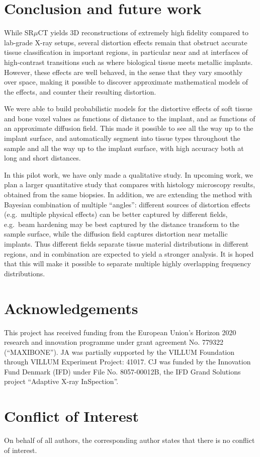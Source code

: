 \section{Conclusion and future work}
\label{sec:conclusion}

While SR$\mu$CT yields 3D reconstructions of extremely high fidelity compared to lab-grade X-ray setups,
several distortion effects remain that obstruct accurate tissue classification in important regions, in particular
near and at interfaces of high-contrast transitions such as where biological tissue meets metallic implants.
However, these effects are well behaved, in the sense that they vary smoothly over space, making it possible
to discover approximate mathematical models of the effects, and counter their resulting distortion.

We were able to build probabilistic models for the distortive effects
of soft tissue and bone voxel values as functions of distance to the
implant, and as functions of an approximate diffusion field. This made
it possible to see all the way up to the implant surface, and
automatically segment into tissue types throughout the sample and all
the way up to the implant surface, with high accuracy both at long and
short distances.

In this pilot work, we have only made a qualitative study. In upcoming
work, we plan a larger quantitative study that compares with histology
microscopy results, obtained from the same biopsies.  In addition, we
are extending the method with Bayesian combination of multiple
``angles'': different sources of distortion effects (e.g.~multiple
physical effects) can be better captured by different fields,
e.g.~beam hardening may be best captured by the distance transform to
the sample surface, while the diffusion field captures distortion near
metallic implants. Thus different fields separate tissue material
distributions in different regions, and in combination are expected to
yield a stronger analysis. It is hoped that this will make it possible
to separate multiple highly overlapping frequency distributions.


\section{Acknowledgements}

This project has received funding from the European Union’s Horizon 2020 research and innovation programme under grant agreement No. 779322 (``MAXIBONE'').
JA was partially supported by the VILLUM Foundation through VILLUM Experiment Project: 41017.
CJ was funded by the Innovation Fund Denmark (IFD) under File No. 8057-00012B, the IFD Grand Solutions project ``Adaptive X-ray InSpection''.

\section{Conflict of Interest}
On behalf of all authors, the corresponding author states that there is no conflict of interest. 


